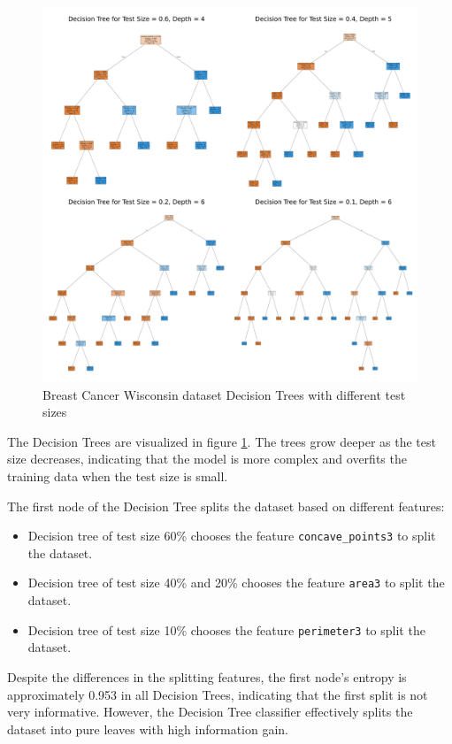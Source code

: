 \begin{figure}[H]
    \centering
    \includegraphics[width=\textwidth]{figures/breast_cancer_wisconsin_decision_trees.pdf}
    \caption{Breast Cancer Wisconsin dataset Decision Trees with different test sizes}
    \label{fig:breast_cancer_wisconsin_decision_trees}
\end{figure}

The Decision Trees are visualized in figure \ref{fig:breast_cancer_wisconsin_decision_trees}. The trees grow deeper as the test size decreases, indicating that the model is more complex and overfits the training data when the test size is small.

The first node of the Decision Tree splits the dataset based on different features:
\begin{itemize}
    \item Decision tree of test size 60\% chooses the feature \texttt{concave\_points3} to split the dataset.
    \item Decision tree of test size 40\% and 20\% chooses the feature \texttt{area3} to split the dataset.
    \item Decision tree of test size 10\% chooses the feature \texttt{perimeter3} to split the dataset.
\end{itemize}

Despite the differences in the splitting features, the first node's entropy is approximately 0.953 in all Decision Trees, indicating that the first split is not very informative. However, the Decision Tree classifier effectively splits the dataset into pure leaves with high information gain.

